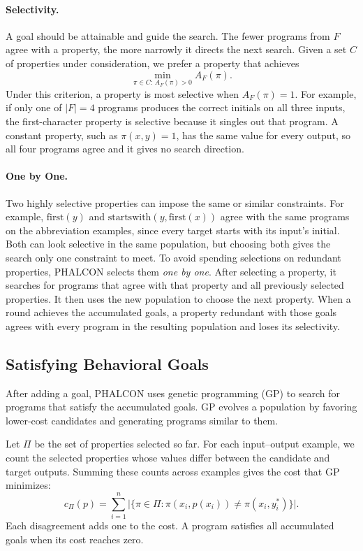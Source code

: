 \documentclass[letterpaper]{article} %
\begin{document}
\paragraph{Selectivity.}
A goal should be attainable and guide the search. The fewer programs
from \(F\) agree with a property, the more narrowly it directs the
next search. Given a set \(C\) of properties under consideration,
we prefer a property that achieves
\[
  \min_{\pi\in C:\,A_F(\pi)>0} A_F(\pi).
\]
Under this criterion, a property is most selective when
\(A_F(\pi)=1\). For example, if only one of \(|F|=4\) programs produces the correct
initials on all three inputs, the first-character property is
selective because it singles out that program. A constant property,
such as \(\pi(x,y)=1\), has the same value for every output, so all
four programs agree and it gives no search direction.

\paragraph{One by One.}
Two highly selective properties can impose the same or similar
constraints. For example, \(\mathrm{first}(y)\) and
\(\mathrm{startswith}(y,\mathrm{first}(x))\) agree with the same
programs on the abbreviation examples, since every target starts
with its input's initial. Both can look selective in the same
population, but choosing both gives the search only one constraint
to meet.
To avoid spending selections on redundant properties, PHALCON
selects them \emph{one by one}. After selecting a property, it
searches for programs that agree with that property and all
previously selected properties. It then uses the new population to
choose the next property. When a round achieves the accumulated
goals, a property redundant with those goals agrees with every
program in the resulting population and loses its selectivity.

\subsection{Satisfying Behavioral Goals}
After adding a goal, PHALCON uses genetic programming (GP) to search
for programs that satisfy the accumulated goals. GP evolves a
population by favoring lower-cost candidates and generating programs
similar to them.

Let \(\Pi\) be the set of properties selected so far. For each
input--output example, we count the selected properties whose values
differ between the candidate and target outputs. Summing these counts
across examples gives the cost that GP minimizes:
\[
  c_\Pi(p)=\sum_{i=1}^{n}
    \bigl|\{\pi\in\Pi : \pi(x_i,p(x_i))\ne\pi(x_i,y_i^*)\}\bigr|.
\]
Each disagreement adds one to the cost. A program satisfies all
accumulated goals when its cost reaches zero.
\end{document}
